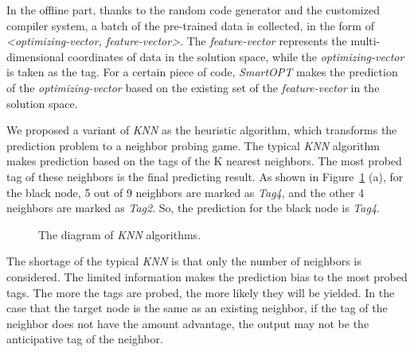 \documentclass[bst/sn-mathphys]{sn-jnl}%
\theoremstyle{thmstyleone}%
\theoremstyle{thmstyletwo}%
\theoremstyle{thmstylethree}%
\begin{document}
In the offline part, thanks to the random code generator and the customized 
compiler system, a batch of the pre-trained data is collected, in the form of 
\emph{<optimizing-vector, feature-vector>}. The \emph{feature-vector} 
represents the multi-dimensional coordinates of data in the solution space, 
while the \emph{optimizing-vector} is taken as the tag. For a certain piece of 
code, \emph{SmartOPT} makes the prediction of the \emph{optimizing-vector} 
based on the existing set of the \emph{feature-vector} in the solution space.

We proposed a variant of \emph{KNN} as the heuristic algorithm, which 
transforms the prediction problem to a neighbor probing game. The typical 
\emph{KNN} algorithm makes prediction based on the tags of the K nearest 
neighbors. The most probed tag of these neighbors is the final predicting 
result. As shown in Figure~\ref{FIG5} (a), for the black node, 5 out of 9 
neighbors are marked as \emph{Tag4}, and the other 4 neighbors are marked as 
\emph{Tag2}. So, the prediction for the black node is \emph{Tag4}.

\begin{figure}[h]%
\centering
{}
\caption{The diagram of \emph{KNN} algorithms.}\label{FIG5}
\end{figure}

The shortage of the typical \emph{KNN} is that only the number of neighbors is 
considered. The limited information makes the prediction bias to the most 
probed tags. The more the tags are probed, the more likely they will be 
yielded. In the case that the target node is the same as an existing neighbor, 
if the tag of the neighbor does not have the amount advantage, the output may 
not be the anticipative tag of the neighbor.
\end{document}
